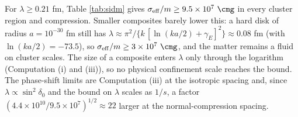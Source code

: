 For $\lambda \ge 0.21$ fm, Table \ref{tab:sidm} gives $\sigma_{\mathrm{eff}}/m \ge 9.5 \times 10^{7}\ \cmg$ in every cluster region and compression. Smaller composites barely lower this: a hard disk of radius $a = 10^{-30}$ fm still has $\lambda \approx \pi^{2}/\{k\,[\ln(ka/2) + \gamma_{E}]^{2}\} \approx 0.08$ fm (with $\ln(ka/2) = -73.5$), so $\sigma_{\mathrm{eff}}/m \ge 3 \times 10^{7}\ \cmg$, and the matter remains a fluid on cluster scales. The size of a composite enters $\lambda$ only through the logarithm (Computation (i) and (iii)), so no physical confinement scale reaches the bound. The phase-shift limits are Computation (iii) at the isotropic spacing and, since $\lambda \propto \sin^{2}\delta_{0}$ and the bound on $\lambda$ scales as $1/s$, a factor $(4.4 \times 10^{10}/9.5 \times 10^{7})^{1/2} \approx 22$ larger at the normal-compression spacing.
